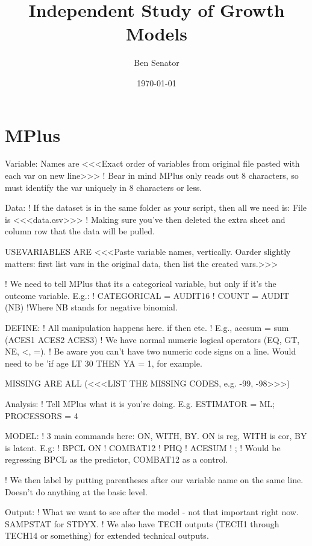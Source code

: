 \documentclass{article}
\title{Independent Study of Growth Models}
\author{Ben Senator}
\date{\today}
\begin{document}
\maketitle

\tableofcontents

\newpage

\section{MPlus}

Variable:
Names are
<<<Exact order of variables from original file pasted with each var on new line>>>
! Bear in mind MPlus only reads out 8 characters, so must identify the var uniquely in 8 characters or less.

Data:
! If the dataset is in the same folder as your script, then all we need is:
File is <<<data.csv>>>
! Making sure you've then deleted the extra sheet and column row that the data will be pulled.

USEVARIABLES ARE
<<<Paste variable names, vertically. Oarder slightly matters: first list vars in the original data, then list the created vars.>>>

! We need to tell MPlus that its a categorical variable, but only if it's the outcome variable. E.g.:
! CATEGORICAL = AUDIT16
! COUNT = AUDIT (NB) !Where NB stands for negative binomial.

DEFINE:
! All manipulation happens here. if then etc.
! E.g., acesum = sum (ACES1
ACES2
ACES3)
! We have normal numeric logical operators (EQ, GT, NE, <, =).
! Be aware you can't have two numeric code signs on a line. Would need to be 'if age LT 30 THEN YA = 1, for example. 

MISSING ARE ALL (<<<LIST THE MISSING CODES, e.g. -99, -98>>>)

Analysis:
! Tell MPlus what it is you're doing. E.g. ESTIMATOR = ML; PROCESSORS = 4

MODEL:
! 3 main commands here: ON, WITH, BY. ON is reg, WITH is cor, BY is latent. E.g:
! BPCL ON
! COMBAT12
! PHQ
! ACESUM
! ;
! Would be regressing BPCL as the predictor, COMBAT12 as a control.

! We then label by putting parentheses after our variable name on the same line. Doesn't do anything at the basic level.

Output:
! What we want to see after the model - not that important right now. SAMPSTAT for STDYX.
! We also have TECH outputs (TECH1 through TECH14 or something) for extended technical outputs.
\end{document}
